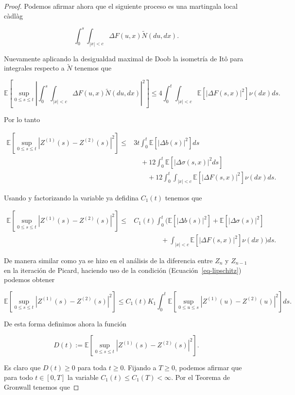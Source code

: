 \documentclass[
  spanish,
  us-letterpaper,
]{scrreprt}
\theoremstyle{plain}
\theoremstyle{plain}
\theoremstyle{plain}
\theoremstyle{definition}
\theoremstyle{remark}
\begin{document}
\begin{proof}
Podemos afirmar ahora que el siguiente proceso es una martingala local
càdlàg

\[
    \int_0^s\int_{|x|<c} \Delta F(u,x)\widetilde{N}(du,dx).
\]

Nuevamente aplicando la desigualdad maximal de Doob la isometría de Itô
para integrales respecto a \(\widetilde{N}\) tenemos que

\[
    \mathbb{E}\left[\sup\limits_{0\leq s\leq t}\left|\int_0^s\int_{|x|<c} \Delta F(u,x)\widetilde{N}(du,dx)\right|^2\right]\leq 4\int_0^t\int_{|x|<c}\mathbb{E}[|\Delta F(s,x)|^2]\nu(dx)ds.
\]

Por lo tanto

\[
    \begin{aligned}
        \mathbb{E}\left[\sup\limits_{0\leq s\leq t}\left|Z^{(1)}(s) - Z^{(2)}(s)\right|^2\right]\leq & 3t\int_0^t \mathbb{E}[|\Delta b(s)|^2]ds\\ 
        & \quad + 12 \int_0^t \mathbb{E}[|\Delta \sigma(s,x)|^2ds]\\ 
        & \qquad +12 \int_0^t\int_{|x|<c}\mathbb{E}[|\Delta F(s,x)|^2]\nu(dx)ds.
    \end{aligned}
\]

Usando y factorizando la variable ya defidina \(C_1(t)\) tenemos que

\[
    \begin{aligned}
        \mathbb{E}\left[\sup\limits_{0\leq s\leq t}\left|Z^{(1)}(s) - Z^{(2)}(s)\right|^2\right]\leq & C_1(t)\int_0^t\Bigg(\mathbb{E}[|\Delta b(s)|^2]+\mathbb{E}[|\Delta \sigma(s)|^2]\\
        & \qquad\qquad +\int_{|x|<c}\mathbb{E}[|\Delta F(s,x)|^2]\nu(dx)\Bigg)ds.
    \end{aligned}
\]

De manera similar como ya se hizo en el análisis de la diferencia entre
\(Z_n\) y \(Z_{n-1}\) en la iteración de Picard, haciendo uso de la
condición (Ecuación~\ref{eq-lipschitz}) podemos obtener

\[
    \mathbb{E}\left[\sup\limits_{0\leq s\leq t}\left|Z^{(1)}(s) - Z^{(2)}(s)\right|^2\right]\leq C_1(t)K_1\int_0^t\mathbb{E}\left[\sup\limits_{0\leq u\leq s}|Z^{(1)}(u) - Z^{(2)}(u)|^2\right]ds.
\]

De esta forma definimos ahora la función

\[
    D(t):=\mathbb{E}\left[\sup\limits_{0\leq s\leq t}\left|Z^{(1)}(s) - Z^{(2)}(s)\right|^2\right].
\]

Es claro que \(D(t)\geq 0\) para toda \(t\geq 0\). Fijando a
\(T\geq 0\), podemos afirmar que para todo \(t\in [0,T]\) la variable
\(C_1(t)\leq C_1(T)<\infty\). Por el Teorema de Gronwall tenemos que


\end{proof}
\end{document}
